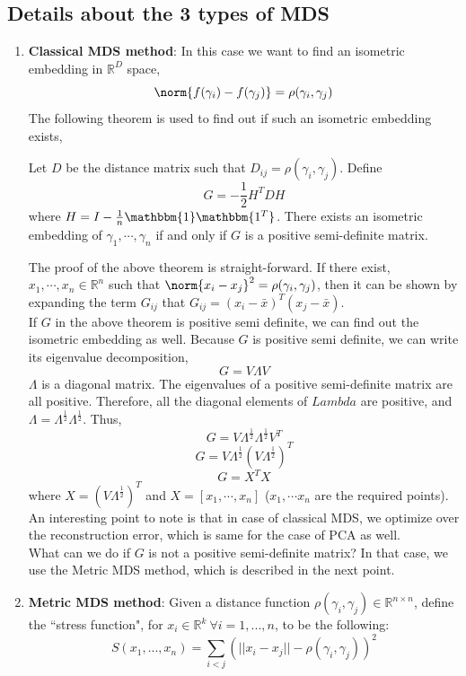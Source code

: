 \subsection{Details about the 3 types of MDS}
\begin{enumerate}
    \item \textbf{Classical MDS method}: In this case we want to find an isometric embedding in $\mathbb{R}^D$ space,
    $$\norm{f(\gamma_i)- f(\gamma_j)} = \rho(\gamma_i,\gamma_j)$$
    The following theorem is used to find out if such  an isometric embedding exists,
\begin{theorem}
Let $D$ be the distance matrix such that $D_{ij}= \rho(\gamma_i, \gamma_j)$. Define $$G= -\frac{1}{2}H^TDH$$
where $H = I-\frac{1}{n}\mathbbm{1}\mathbbm{1^T}$. There exists an isometric embedding of $\gamma_1, \cdots, \gamma_n$ if and only if $G$ is a positive semi-definite matrix.
\end{theorem} 
The proof of the above theorem is straight-forward. If there exist, $x_1, \cdots, x_n \in \mathbb{R}^n$ such that $\norm{x_i - x_j}^2 = \rho(\gamma_i, \gamma_j)$, then it can be shown by expanding the term $G_{ij}$ that $G_{ij}= (x_i-\bar{x})^T(x_j- \bar{x})$.\\
If $G$ in the above theorem is positive semi definite, we can find out the isometric embedding as well. Because $G$ is positive semi definite, we can write its eigenvalue decomposition,
$$G = V\Lambda V$$
$\Lambda$ is a diagonal matrix. The eigenvalues of a positive semi-definite matrix are all positive. Therefore, all the diagonal elements of $Lambda$ are positive, and $\Lambda = \Lambda^{\frac{1}{2}}\Lambda^{\frac{1}{2}}$. Thus,
$$G = V\Lambda^{\frac{1}{2}}\Lambda^{\frac{1}{2}}V^T$$
$$G = V\Lambda^{\frac{1}{2}}(V\Lambda^{\frac{1}{2}})^T$$
$$G = X^TX$$
where $X = (V\Lambda^{\frac{1}{2}})^T$ and $X = [x_1, \cdots, x_n]$ ($x_1, \cdots x_n$ are the required points). \\
An interesting point to note is that in case of classical MDS, we optimize over the reconstruction error, which is same for the case of PCA as well.\\
What can we do if $G$ is not a positive semi-definite matrix? In that case, we use the Metric MDS method, which is described in the next point.
\item \textbf{Metric MDS method}: Given a distance function $\rho(\gamma_i, \gamma_j) \in \mathbb{R}^{n\times n}$, define the
``stress function", for $x_i \in \mathbb{R}^k \ \forall i=1,...,n$, to
be the following: 
\[
S(x_1,...,x_n) = \sum_{i<j}(||x_i-x_j||-\rho(\gamma_i, \gamma_j))^2
\]
\end{enumerate}
